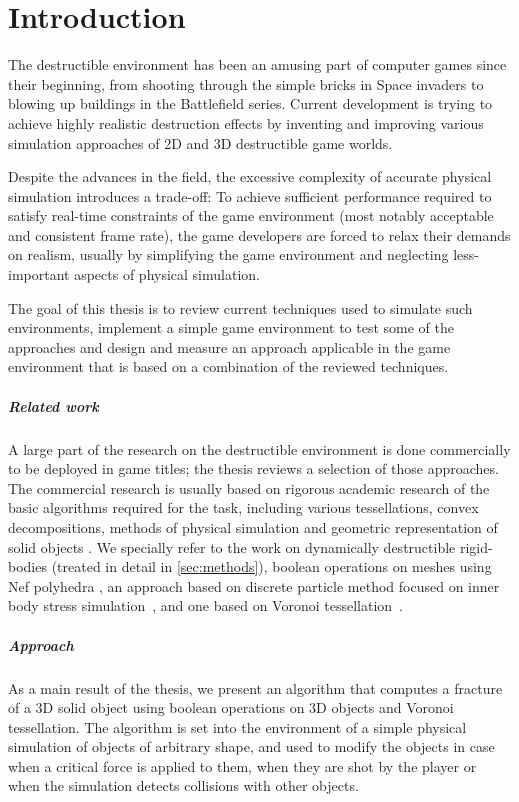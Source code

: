\chapter*{Introduction}
The destructible environment has been an amusing part of computer games since their beginning, from shooting through the simple bricks in Space invaders to blowing up buildings in the Battlefield series. Current development is trying to achieve highly realistic destruction effects by inventing and improving various simulation approaches of 2D and 3D destructible game worlds.

Despite the advances in the field, the excessive complexity of accurate physical simulation introduces a trade-off: To achieve sufficient performance required to satisfy real-time constraints of the game environment (most notably acceptable and consistent frame rate), the game developers are forced to relax their demands on realism, usually by simplifying the game environment and neglecting less-important aspects of physical simulation.

The goal of this thesis is to review current techniques used to simulate such environments, implement a simple game environment to test some of the approaches and design and measure an approach applicable in the game environment that is based on a combination of the reviewed techniques.

\paragraph{Related work}
A large part of the research on the destructible environment is done commercially to be deployed in game titles; the thesis reviews a selection of those approaches. The commercial research is usually based on rigorous academic research of the basic algorithms required for the task, including various tessellations, convex decompositions, methods of physical simulation and geometric representation of solid objects . We specially refer to the work on dynamically destructible rigid-bodies (treated in detail in \cref{sec:methods}), boolean operations on meshes using Nef polyhedra \citet{nefpoly}, an approach based on discrete particle method focused on inner body stress simulation~\cite{edem}, and one based on Voronoi tessellation~\cite{nvidia}.

\paragraph{Approach}
As a main result of the thesis, we present an algorithm that computes a fracture of a 3D solid object using boolean operations on 3D objects and Voronoi tessellation. The algorithm is set into the environment of a simple physical simulation of objects of arbitrary shape, and used to modify the objects in case when a critical force is applied to them, \ie when they are shot by the player or when the simulation detects collisions with other objects.

